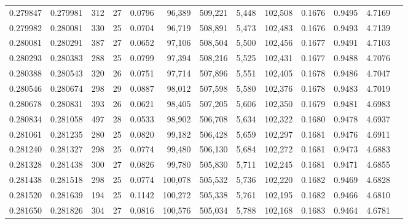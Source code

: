 \begin{tabular}{rrrrrrrrrrrrr}
0.279847 & 0.279981 &   312 &  27 &                                     0.0796 &  96,389 & 509,221 &   5,448 & 102,508 & 0.1676 & 0.9495 & 4.7169 \\
0.279982 & 0.280081 &   330 &  25 &                                     0.0704 &  96,719 & 508,891 &   5,473 & 102,483 & 0.1676 & 0.9493 & 4.7139 \\
0.280081 & 0.280291 &   387 &  27 &                                     0.0652 &  97,106 & 508,504 &   5,500 & 102,456 & 0.1677 & 0.9491 & 4.7103 \\
0.280293 & 0.280383 &   288 &  25 &                                     0.0799 &  97,394 & 508,216 &   5,525 & 102,431 & 0.1677 & 0.9488 & 4.7076 \\
0.280388 & 0.280543 &   320 &  26 &                                     0.0751 &  97,714 & 507,896 &   5,551 & 102,405 & 0.1678 & 0.9486 & 4.7047 \\
0.280546 & 0.280674 &   298 &  29 &                                     0.0887 &  98,012 & 507,598 &   5,580 & 102,376 & 0.1678 & 0.9483 & 4.7019 \\
0.280678 & 0.280831 &   393 &  26 &                                     0.0621 &  98,405 & 507,205 &   5,606 & 102,350 & 0.1679 & 0.9481 & 4.6983 \\
0.280834 & 0.281058 &   497 &  28 &                                     0.0533 &  98,902 & 506,708 &   5,634 & 102,322 & 0.1680 & 0.9478 & 4.6937 \\
0.281061 & 0.281235 &   280 &  25 &                                     0.0820 &  99,182 & 506,428 &   5,659 & 102,297 & 0.1681 & 0.9476 & 4.6911 \\
0.281240 & 0.281327 &   298 &  25 &                                     0.0774 &  99,480 & 506,130 &   5,684 & 102,272 & 0.1681 & 0.9473 & 4.6883 \\
0.281328 & 0.281438 &   300 &  27 &                                     0.0826 &  99,780 & 505,830 &   5,711 & 102,245 & 0.1681 & 0.9471 & 4.6855 \\
0.281438 & 0.281518 &   298 &  25 &                                     0.0774 & 100,078 & 505,532 &   5,736 & 102,220 & 0.1682 & 0.9469 & 4.6828 \\
0.281520 & 0.281639 &   194 &  25 &                                     0.1142 & 100,272 & 505,338 &   5,761 & 102,195 & 0.1682 & 0.9466 & 4.6810 \\
0.281650 & 0.281826 &   304 &  27 &                                     0.0816 & 100,576 & 505,034 &   5,788 & 102,168 & 0.1683 & 0.9464 & 4.6781 \\

\end{tabular}
